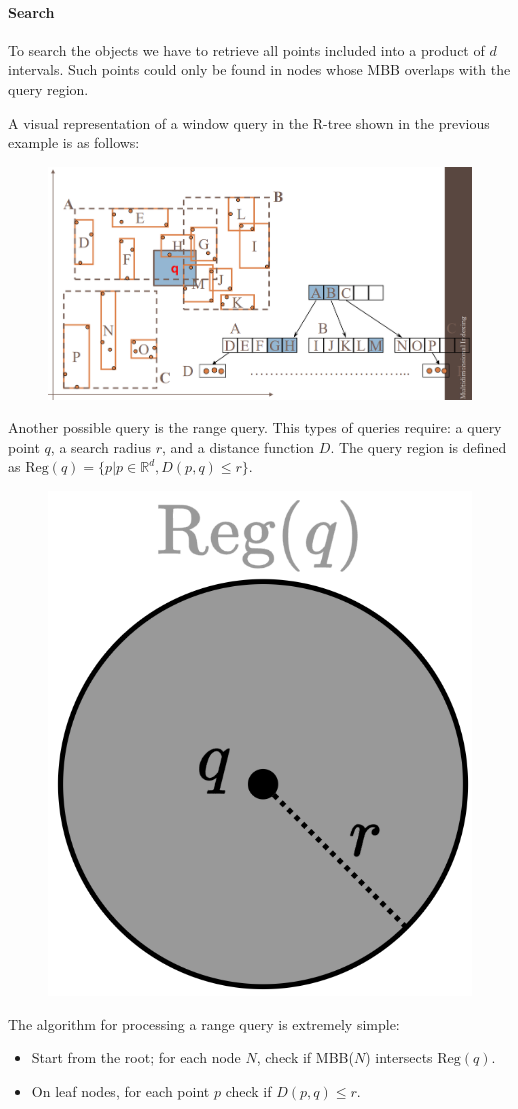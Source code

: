 \paragraph*{Search}
To search the objects we have to retrieve all points included into a product of $d$ intervals. 
Such points could only be found in nodes whose MBB overlaps with the query region. 
\begin{example}
    A visual representation of a window query in the R-tree shown in the previous example is as follows: 
    \begin{figure}[H]
        \centering
        \includegraphics[width=0.5\linewidth]{images/r3.png}
    \end{figure}
\end{example}
Another possible query is the range query. 
This types of queries require: a query point $q$, a search radius $r$, and a distance function $D$.
The query region is defined as $\text{Reg}(q)=\{p|p \in \mathbb{R}^d, D(p,q) \leq r\}$. 
\begin{figure}[H]
    \centering
    \includegraphics[width=0.15\linewidth]{images/r4.png}
\end{figure}
The algorithm for processing a range query is extremely simple:
\begin{itemize}
    \item Start from the root; for each node $N$, check if MBB($N$) intersects $\text{Reg}(q)$. 
    \item On leaf nodes, for each point $p$ check if $D(p,q) \leq r$. 
\end{itemize}

